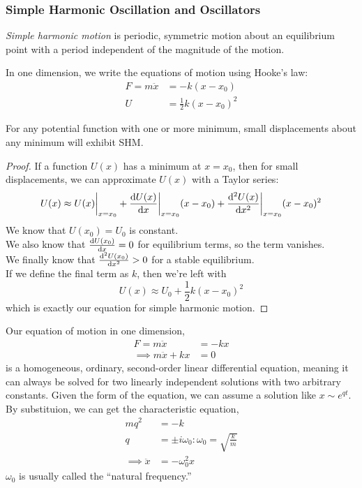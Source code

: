 \documentclass[a4paper]{article}
\begin{document}
\subsubsection{Simple Harmonic Oscillation and Oscillators}
\begin{defi}
	\emph{Simple harmonic motion} is periodic, symmetric motion about an
	equilibrium point with a period independent of the magnitude of the
	motion.
\end{defi}

In one dimension, we write the equations of motion using Hooke's law:
\begin{align*}
	F = m\ddot{x} &= -k(x-x_0)\\
	U &= \frac{1}{2}k(x-x_0)^2
\end{align*}

\begin{prop}
	For any potential function with one or more minimum, small
	displacements about any minimum will exhibit SHM.
\end{prop}

\begin{proof}
	If a function $U(x)$ has a minimum at $x=x_0$, then for small
	displacements, we can approximate $U(x)$ with a Taylor series:
	\begin{align*}
		U(x) \approx U(x)\bigg\lvert_{x=x_0}
		+ \frac{\mathrm{d} U(x)}{\mathrm{d} x}\bigg\lvert_{x=x_0}(x-x_0)
		+ \frac{\mathrm{d}^2U(x)}{\mathrm{d} x^2}\bigg\lvert_{x=x_0}(x-x_0)^2
	\end{align*}
	We know that $U(x_0) = U_0$ is constant.\\
	We also know that $\frac{\mathrm{d} U(x_0)}{\mathrm{d} x} = 0$ for equilibrium terms,
	so the term vanishes.\\
	We finally know that $\frac{\mathrm{d}^2U(x_0)}{\mathrm{d} x^2} > 0$ for a 
	stable equilibrium.\\
	If we define the final term as $k$, then we're left with
	\[U(x) \approx U_0+\frac{1}{2}k(x-x_0)^2\]
	which is exactly our equation for simple harmonic motion.
\end{proof}

Our equation of motion in one dimension,
\begin{align*}
	F=m\ddot{x}&=-kx\\
	\implies m\ddot{x}+kx&=0
\end{align*}
is a homogeneous, ordinary, second-order linear differential equation, meaning
it can always be solved for two linearly independent solutions with two
arbitrary constants. Given the form of the equation, we can assume a solution
like $x\sim e^{qt}$. By substituion, we can get the characteristic equation,
\begin{align*}
	mq^2 &= -k\\
	q &= \pm i \omega_0 : \omega_0 = \sqrt{\frac{k}{m}}\\
	\implies \ddot{x} &= -\omega_0^2x
\end{align*}
$\omega_0$ is usually called the ``natural frequency.''
\end{document}
